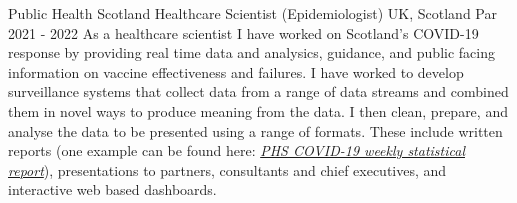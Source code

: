 \cventry
{Public Health Scotland} %
{Healthcare Scientist (Epidemiologist)} %
{UK, Scotland} %
{Par 2021 - 2022} %
{
    As a healthcare scientist I have worked on Scotland's COVID-19 response by 
        providing real time data and analysics, guidance, and public facing 
        information on vaccine effectiveness and failures.\newline
        I have worked to develop surveillance systems that collect data from a range 
        of data streams and combined them in novel ways to produce meaning from the 
        data. I then clean, prepare, and analyse the data to be presented using a 
        range of formats. These include written reports (one example can be found 
                here: \href{https://publichealthscotland.scot/publications/covid-19-statistical-report/}
                {\textit{PHS COVID-19 weekly statistical report}}), presentations to 
    partners, consultants and chief executives, and interactive web based 
        dashboards.
}
